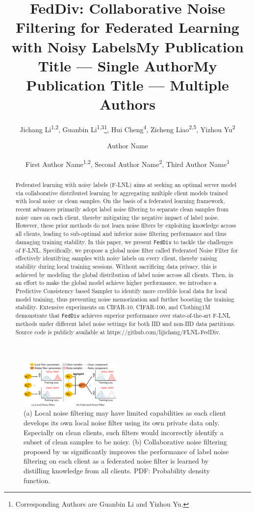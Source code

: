 \documentclass[letterpaper]{article} %
\title{FedDiv: Collaborative Noise Filtering for Federated Learning with Noisy Labels}
\author{
    Jichang Li\textsuperscript{\rm 1,\rm 2},
    Guanbin Li\textsuperscript{\rm 1,\rm 3}{\Large \thanks{Corresponding Authors are Guanbin Li and Yizhou Yu.}},
    Hui Cheng\textsuperscript{\rm 4},
    Zicheng Liao\textsuperscript{\rm 2,\rm 5},
    Yizhou Yu\textsuperscript{\rm 2{\small *}}
}
\title{My Publication Title --- Single Author}
\author {
    Author Name
}
\title{My Publication Title --- Multiple Authors}
\author {
    First Author Name\textsuperscript{\rm 1,\rm 2},
    Second Author Name\textsuperscript{\rm 2},
    Third Author Name\textsuperscript{\rm 1}
}
\begin{document}

\maketitle
 
\begin{abstract}
Federated learning with noisy labels (F-LNL) aims at seeking an optimal server model via collaborative distributed learning by aggregating multiple client models trained with local noisy or clean samples. On the basis of a federated learning framework, recent advances primarily adopt label noise filtering to separate clean samples from noisy ones on each client, thereby mitigating the negative impact of label noise. However, these prior methods do not learn noise filters by exploiting knowledge across all clients, leading to sub-optimal and inferior noise filtering performance and thus damaging training stability. In this paper, we present \texttt{FedDiv} to tackle the challenges of F-LNL. Specifically, we propose a global noise filter called Federated Noise Filter for effectively identifying samples with noisy labels on every client, thereby raising stability during local training sessions. Without sacrificing data privacy, this is achieved by modeling the global distribution of label noise across all clients. Then, in an effort to make the global model achieve higher performance, we introduce a Predictive Consistency based Sampler to identify more credible local data for local model training, thus preventing noise memorization and further boosting the training stability. Extensive experiments on CIFAR-10, CIFAR-100, and Clothing1M demonstrate that \texttt{FedDiv} achieves superior performance over state-of-the-art F-LNL methods under different label noise settings for both IID and non-IID data partitions. Source code is publicly available at https://github.com/lijichang/FLNL-FedDiv.
\end{abstract}

\begin{figure}[ht]

    \centering
    \includegraphics[width=0.45\textwidth]{figures/overview.pdf}
    
    \caption{
    (a) Local noise filtering may have limited capabilities as each client develops its own local noise filter using its own private data only. Especially on clean clients, such filters would incorrectly identify a subset of clean samples to be noisy.
    (b) Collaborative noise filtering proposed by us significantly improves the performance of label noise filtering on each client as a federated noise filter is learned by distilling knowledge from all clients.
    PDF: Probability density function.} 
    \label{Figure:Overview}
\end{figure}
\end{document}
